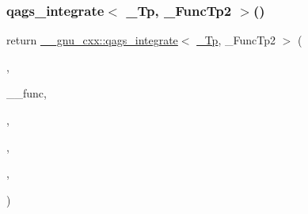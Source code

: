 \subsubsection{\texorpdfstring{qags\+\_\+integrate$<$ \+\_\+\+Tp, \+\_\+\+Func\+Tp2 $>$()}{qags\_integrate< \_Tp, \_FuncTp2 >()}\hspace{0.1cm}{\footnotesize\ttfamily [2/4]}}
{\footnotesize\ttfamily return \hyperlink{namespace____gnu__cxx_afde6c192a4e11d49f4c9c117277980ff}{\+\_\+\+\_\+gnu\+\_\+cxx\+::qags\+\_\+integrate}$<$ \hyperlink{namespace____gnu__cxx_a3b19a9c800ca194374ef9172290f7d79}{\+\_\+\+Tp}, \+\_\+\+Func\+Tp2 $>$ (\begin{DoxyParamCaption}\item[{\+\_\+\+\_\+workspace}]{,  }\item[{\hyperlink{struct____gnu__cxx_1_1map__minf__pinf__symm}{map\+\_\+minf\+\_\+pinf\+\_\+symm}$<$ \hyperlink{namespace____gnu__cxx_a3b19a9c800ca194374ef9172290f7d79}{\+\_\+\+Tp}, \+\_\+\+Func\+Tp $>$}]{\+\_\+\+\_\+func,  }\item[{\hyperlink{namespace____gnu__cxx_a3b19a9c800ca194374ef9172290f7d79}{\+\_\+\+Tp}\{0\}}]{,  }\item[{\hyperlink{namespace____gnu__cxx_a3b19a9c800ca194374ef9172290f7d79}{\+\_\+\+Tp}\{1\}}]{,  }\item[{\+\_\+\+\_\+max\+\_\+abs\+\_\+err}]{,  }\item[{\+\_\+\+\_\+max\+\_\+rel\+\_\+err}]{ }\end{DoxyParamCaption})}

\mbox{\label{namespace____gnu__cxx_a82afc5fe73ee3fd1e16fd7b7f126379f}} 
